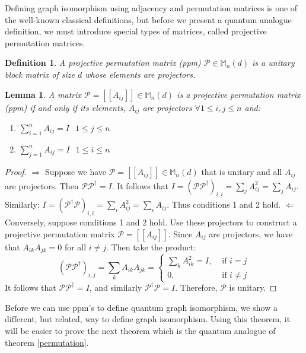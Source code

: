 \documentclass[12pt]{article}
\newtheorem{lem}[thm]{Lemma}
\newtheorem{defn}[thm]{Definition}
\begin{document}
Defining graph isomorphism using adjacency and permutation matrices is one of the well-known classical definitions, but before we present a quantum analogue definition, we must introduce special types of matrices, called projective permutation matrices.

\begin{defn}
A projective permutation matrix (ppm) $\mathcal{P} \in \mathbb{M}_n(d)$ is a unitary block matrix of size $d$ whose elements are projectors.
\end{defn}

\begin{lem} \label{ppm}
A matrix $\mathcal{P} = [[A_{ij}]] \in \mathbb{M}_n(d)$ is a projective permutation matrix (ppm) if and only if its elements, $A_{ij}$ are projectors $\forall 1 \leq i, j \leq n$ and:
\begin{enumerate}
\item $\sum_{i=1}^n A_{ij} = I$ $ $ $1 \leq j \leq n$
\item $\sum_{j=1}^n A_{ij} = I$ $ $ $1 \leq i \leq n$
\end{enumerate}
\end{lem}
\begin{proof}
$\Rightarrow$ Suppose we have $\mathcal{P} = [[A_{ij}]] \in \mathbb{M}_n(d)$ that is unitary and all $A_{ij}$ are projectors. Then $\mathcal{P} \mathcal{P}^{\dag} = I$. It follows that $I = (\mathcal{P} \mathcal{P}^{\dag})_{i, i} = \sum_j A_{ij}^2 = \sum_j A_{ij}$. Similarly: $I = (\mathcal{P}^{\dag} \mathcal{P})_{i, i} = \sum_i A_{ij}^2 = \sum_i A_{ij}$. Thus conditions 1 and 2 hold.
$\Leftarrow$ Conversely, suppose conditions 1 and 2 hold. Use these projectors to construct a projective permutation matrix $\mathcal{P} = [[A_{ij}]]$. Since $A_{ij}$ are projectors, we have that $A_{ik}A_{jk} = 0$ for all $i \neq j$. Then take the product: 
\[ (\mathcal{P}\mathcal{P}^{\dag})_{i,j} = \sum_k A_{ik}A_{jk} = \begin{cases} 
\sum_k A_{ik}^2 = I, & \text{ if } i = j \\
0, & \text{ if } i \neq j  \end{cases}
\]
It follows that $\mathcal{P}\mathcal{P}^{\dag} = I$, and similarly $\mathcal{P}^{\dag} \mathcal{P} = I$. Therefore, $\mathcal{P}$ is unitary.
\end{proof}

Before we can use ppm's to define quantum graph isomorphism, we show a different, but related, way to define graph isomorphism. Using this theorem, it will be easier to prove the next theorem which is the quantum analogue of theorem \ref{permutation}.
\end{document}
